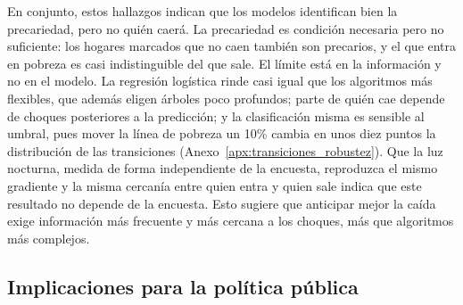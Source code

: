 \documentclass[12pt, letterpaper]{article}
\begin{document}
En conjunto, estos hallazgos indican que los modelos identifican bien
la precariedad, pero no quién caerá. La precariedad es condición necesaria
pero no suficiente: los hogares marcados que no caen también son precarios,
y el que entra en pobreza es casi indistinguible del que sale. El límite
está en la información y no en el modelo. La regresión logística rinde casi
igual que los algoritmos más flexibles, que además eligen árboles poco
profundos; parte de quién cae depende de choques posteriores a la
predicción; y la clasificación misma es sensible al umbral, pues mover la
línea de pobreza un 10\% cambia en unos diez puntos la distribución de las
transiciones (Anexo~\ref{apx:transiciones_robustez}). Que la luz nocturna,
medida de forma independiente de la encuesta, reproduzca el mismo gradiente
y la misma cercanía entre quien entra y quien sale indica que este resultado
no depende de la encuesta. Esto sugiere que anticipar mejor la caída
exige información más frecuente y más cercana a los choques, más que
algoritmos más complejos.

\subsection{Implicaciones para la política pública}
\label{subsec:politica}
\end{document}
